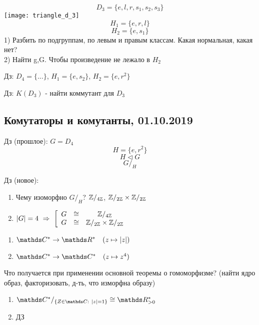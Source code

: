 \documentclass[12pt, fleqn]{article}
\begin{document}
\begin{Example}
    \[D_3=\{e,l,r,s_1,s_2,s_3\}\]
    \texttt{[image: triangle\_d\_3]}
    \[H_1=\{e,r,l\}\]
    \[H_2=\{e,s_1\}\]
    1) Разбить по подгруппам, по левым и правым классам. Какая нормальная, какая нет?\\
    2) Найти g,G. Чтобы произведение не лежало в $H_2$
\end{Example}

Дз: $D_4=\{...\}$, $H_1=\{e,s_2\}$, $H_2=\{e, r^2\}$

Дз: $K(D_3)$ - найти коммутант для $D_3$

\subsection{Комутаторы и комутанты, 01.10.2019}

\begin{example}
  Дз (прошлое): $G=D_4$
  \[H=\{e,r^2\}\]
  \[H \triangleleft G\]
  \[G/_H\]
\end{example}

Дз (новое):
\begin{enumerate}
  \item Чему изоморфно $G/_H$? $\mathbb{Z}/_{4 \mathbb{Z}}$, $\mathbb{Z}/_{2 \mathbb{Z}} \times \mathbb{Z}/_{2 \mathbb{Z}}$
  \item $|G|=4 \ \Rightarrow \
  \left[
  \begin{array}{ccc}
     G & \cong & \mathbb{Z}/_{4 \mathbb{Z}} \\
     G & \cong & \mathbb{Z}/_{2 \mathbb{Z}} \times \mathbb{Z}/_{2 \mathbb{Z}} \\
  \end{array}
\right.$
\end{enumerate}

\begin{example}

\end{example}

\begin{example}
  \begin{enumerate}
    \item $\CC^* \ra \R^* \q (z \mapsto |z|)$
    \item $\CC^* \ra \CC^* \q (z \mapsto z^4)$

  \end{enumerate}
  Что получается при применении основной теоремы о гомоморфизме? (найти ядро образ, факторизовать, д-ть, что изморфна образу)
\end{example}

\begin{sol}
  \begin{enumerate}
    \item $\CC^*/_{\{Z \in \CC:\ |z|=1\}} \cong \R^*_{>0}$
    \item ДЗ
  \end{enumerate}
\end{sol}
\end{document}
